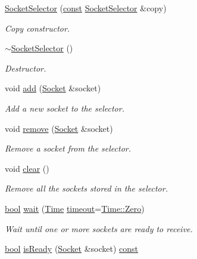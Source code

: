 \begin{DoxyCompactItemize}
\hyperlink{classsf_1_1_socket_selector_a50b1b955eb7ecb2e7c2764f3f4722fbf}{Socket\-Selector} (\hyperlink{term__entry_8h_a57bd63ce7f9a353488880e3de6692d5a}{const} \hyperlink{classsf_1_1_socket_selector}{Socket\-Selector} \&copy)
\begin{DoxyCompactList}\small\item\em Copy constructor. \end{DoxyCompactList}\item 
\hyperlink{classsf_1_1_socket_selector_a9069cd61208260b8ed9cf233afa1f73d}{$\sim$\-Socket\-Selector} ()
\begin{DoxyCompactList}\small\item\em Destructor. \end{DoxyCompactList}\item 
void \hyperlink{classsf_1_1_socket_selector_ade952013232802ff7b9b33668f8d2096}{add} (\hyperlink{classsf_1_1_socket}{Socket} \&socket)
\begin{DoxyCompactList}\small\item\em Add a new socket to the selector. \end{DoxyCompactList}\item 
void \hyperlink{classsf_1_1_socket_selector_a98b6ab693a65b82caa375639232357c1}{remove} (\hyperlink{classsf_1_1_socket}{Socket} \&socket)
\begin{DoxyCompactList}\small\item\em Remove a socket from the selector. \end{DoxyCompactList}\item 
void \hyperlink{classsf_1_1_socket_selector_a76e650acb0199d4be91e90a493fbc91a}{clear} ()
\begin{DoxyCompactList}\small\item\em Remove all the sockets stored in the selector. \end{DoxyCompactList}\item 
\hyperlink{term__entry_8h_a002004ba5d663f149f6c38064926abac}{bool} \hyperlink{classsf_1_1_socket_selector_a9cfda5475f17925e65889394d70af702}{wait} (\hyperlink{classsf_1_1_time}{Time} \hyperlink{_ndk_8cpp_a174cf046f3b5dbb1258515b3f138b8c7}{timeout}=\hyperlink{classsf_1_1_time_aa343e67f43a940e7b3b51aa10a495f2f}{Time\-::\-Zero})
\begin{DoxyCompactList}\small\item\em Wait until one or more sockets are ready to receive. \end{DoxyCompactList}\item 
\hyperlink{term__entry_8h_a002004ba5d663f149f6c38064926abac}{bool} \hyperlink{classsf_1_1_socket_selector_a8e67b463db05eadb4d356992c896833c}{is\-Ready} (\hyperlink{classsf_1_1_socket}{Socket} \&socket) \hyperlink{term__entry_8h_a57bd63ce7f9a353488880e3de6692d5a}{const} 

\end{DoxyCompactItemize}
